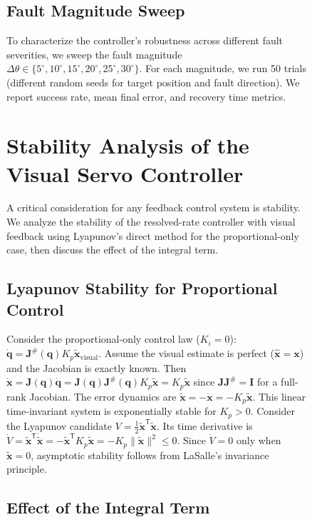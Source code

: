 \documentclass[12pt,a4paper,oneside]{report}
\begin{document}
\begin{figure}[H]
\subsection{Fault Magnitude Sweep}

To characterize the controller's robustness across different fault severities, we sweep the fault magnitude $\Delta \theta \in \{5^\circ, 10^\circ, 15^\circ, 20^\circ, 25^\circ, 30^\circ\}$. For each magnitude, we run 50 trials (different random seeds for target position and fault direction). We report success rate, mean final error, and recovery time metrics.

\section{Stability Analysis of the Visual Servo Controller}

A critical consideration for any feedback control system is stability. We analyze the stability of the resolved-rate controller with visual feedback using Lyapunov's direct method for the proportional-only case, then discuss the effect of the integral term.

\subsection{Lyapunov Stability for Proportional Control}

Consider the proportional-only control law ($K_i = 0$): $\dot{\mathbf{q}} = \mathbf{J}^{\#}(\mathbf{q}) K_p \tilde{\mathbf{x}}_{\text{visual}}$. Assume the visual estimate is perfect ($\hat{\mathbf{x}} = \mathbf{x}$) and the Jacobian is exactly known. Then $\dot{\mathbf{x}} = \mathbf{J}(\mathbf{q}) \dot{\mathbf{q}} = \mathbf{J}(\mathbf{q}) \mathbf{J}^{\#}(\mathbf{q}) K_p \tilde{\mathbf{x}} = K_p \tilde{\mathbf{x}}$ since $\mathbf{J} \mathbf{J}^{\#} = \mathbf{I}$ for a full-rank Jacobian. The error dynamics are $\dot{\tilde{\mathbf{x}}} = -\dot{\mathbf{x}} = -K_p \tilde{\mathbf{x}}$. This linear time-invariant system is exponentially stable for $K_p > 0$. Consider the Lyapunov candidate $V = \frac{1}{2} \tilde{\mathbf{x}}^{\mathsf{T}} \tilde{\mathbf{x}}$. Its time derivative is $\dot{V} = \tilde{\mathbf{x}}^{\mathsf{T}} \dot{\tilde{\mathbf{x}}} = -\tilde{\mathbf{x}}^{\mathsf{T}} K_p \tilde{\mathbf{x}} = -K_p \|\tilde{\mathbf{x}}\|^2 \leq 0$. Since $\dot{V} = 0$ only when $\tilde{\mathbf{x}} = 0$, asymptotic stability follows from LaSalle's invariance principle.

\subsection{Effect of the Integral Term}


\end{figure}
\end{document}
